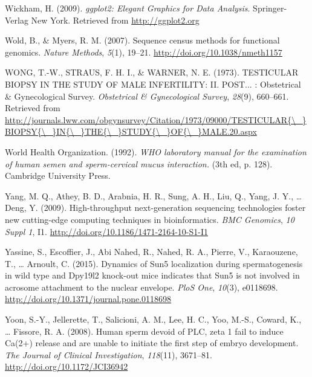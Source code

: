 \documentclass[12pt,twoside]{reedthesis}
\theoremstyle{definition}
\theoremstyle{definition}
\theoremstyle{remark}
\begin{document}
  \hypertarget{ref-Wickham2009}{}
  Wickham, H. (2009). \emph{ggplot2: Elegant Graphics for Data Analysis}.
  Springer-Verlag New York. Retrieved from \url{http://ggplot2.org}
  
  \hypertarget{ref-Wold2007}{}
  Wold, B., \& Myers, R. M. (2007). Sequence census methods for functional
  genomics. \emph{Nature Methods}, \emph{5}(1), 19--21.
  \url{http://doi.org/10.1038/nmeth1157}
  
  \hypertarget{ref-WONG1973}{}
  WONG, T.-W., STRAUS, F. H. I., \& WARNER, N. E. (1973). TESTICULAR
  BIOPSY IN THE STUDY OF MALE INFERTILITY: II. POST... : Obstetrical \&
  Gynecological Survey. \emph{Obstetrical \& Gynecological Survey},
  \emph{28}(9), 660--661. Retrieved from
  \href{http://journals.lww.com/obgynsurvey/Citation/1973/09000/TESTICULAR\%7B/_\%7DBIOPSY\%7B/_\%7DIN\%7B/_\%7DTHE\%7B/_\%7DSTUDY\%7B/_\%7DOF\%7B/_\%7DMALE.20.aspx}{http://journals.lww.com/obgynsurvey/Citation/1973/09000/TESTICULAR\{\textbackslash{}\_\}BIOPSY\{\textbackslash{}\_\}IN\{\textbackslash{}\_\}THE\{\textbackslash{}\_\}STUDY\{\textbackslash{}\_\}OF\{\textbackslash{}\_\}MALE.20.aspx}
  
  \hypertarget{ref-WorldHealthOrganization1992}{}
  World Health Organization. (1992). \emph{WHO laboratory manual for the
  examination of human semen and sperm-cervical mucus interaction.} (3th
  ed, p. 128). Cambridge University Press.
  
  \hypertarget{ref-Yang2009}{}
  Yang, M. Q., Athey, B. D., Arabnia, H. R., Sung, A. H., Liu, Q., Yang,
  J. Y., \ldots{} Deng, Y. (2009). High-throughput next-generation
  sequencing technologies foster new cutting-edge computing techniques in
  bioinformatics. \emph{BMC Genomics}, \emph{10 Suppl 1}, I1.
  \url{http://doi.org/10.1186/1471-2164-10-S1-I1}
  
  \hypertarget{ref-Yassine2015}{}
  Yassine, S., Escoffier, J., Abi Nahed, R., Nahed, R. A., Pierre, V.,
  Karaouzene, T., \ldots{} Arnoult, C. (2015). Dynamics of Sun5
  localization during spermatogenesis in wild type and Dpy19l2 knock-out
  mice indicates that Sun5 is not involved in acrosome attachment to the
  nuclear envelope. \emph{PloS One}, \emph{10}(3), e0118698.
  \url{http://doi.org/10.1371/journal.pone.0118698}
  
  \hypertarget{ref-Yoon2008}{}
  Yoon, S.-Y., Jellerette, T., Salicioni, A. M., Lee, H. C., Yoo, M.-S.,
  Coward, K., \ldots{} Fissore, R. A. (2008). Human sperm devoid of PLC,
  zeta 1 fail to induce Ca(2+) release and are unable to initiate the
  first step of embryo development. \emph{The Journal of Clinical
  Investigation}, \emph{118}(11), 3671--81.
  \url{http://doi.org/10.1172/JCI36942}
  
\end{document}

